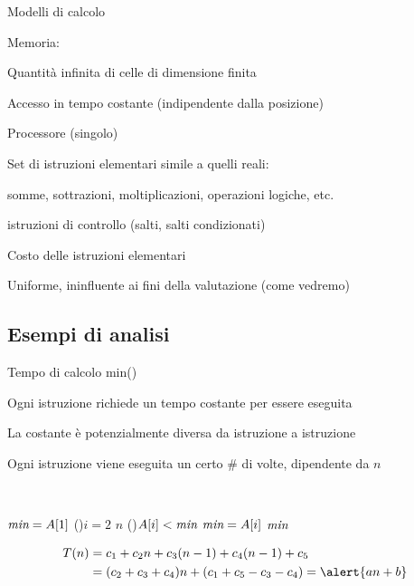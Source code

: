 \begin{frame}{Modelli di calcolo}
    
\vspace{-9pt}
\begin{myboxtitle}
\BI
\item \alert{Memoria}:
\BI
\item Quantità infinita di celle di dimensione finita
\item Accesso in tempo costante (indipendente dalla posizione)
\EI
\item \alert{Processore (singolo)}
\BI
\item Set di istruzioni elementari simile a quelli reali: 
\BI
\item  somme, sottrazioni, moltiplicazioni, operazioni logiche, etc. 
\item istruzioni di controllo (salti, salti condizionati)
\EI
\EI
\item \alert{Costo delle istruzioni elementari}
\BI
\item Uniforme, ininfluente ai fini della valutazione (come vedremo)
\EI
\EI
\end{myboxtitle}
\end{frame}

\subsection{Esempi di analisi}

\begin{frame}{Tempo di calcolo \textsf{min}()}
	
\BI
\item Ogni istruzione richiede un tempo costante per essere eseguita
\item La costante è potenzialmente diversa da istruzione a istruzione
\item Ogni istruzione viene eseguita un certo \# di volte, dipendente da $n$
\EI	
	
	
\begin{Procedure}
~
\caption[A]{\Item \MIN($\Item[\,]\ A,\ \INTEGER\ n$)}
\Item $\textit{min} = A[1]$
\For(){$i = 2$ \TO $n$}
{
   \If(){$A[i] < \textit{min}$}{ 
      $\textit{min} = A[i]$
   }
}
\Return $\textit{min}$
\end{Procedure}

\vspace{-12pt}
\begin{align*}
T(n) 	&= c_1+c_2n+c_3(n-1)+c_4(n-1)+c_5\\
		&= (c_2+c_3+c_4)n+(c_1+c_5-c_3-c_4) = \alert{an+b}
\end{align*}
\end{frame}

